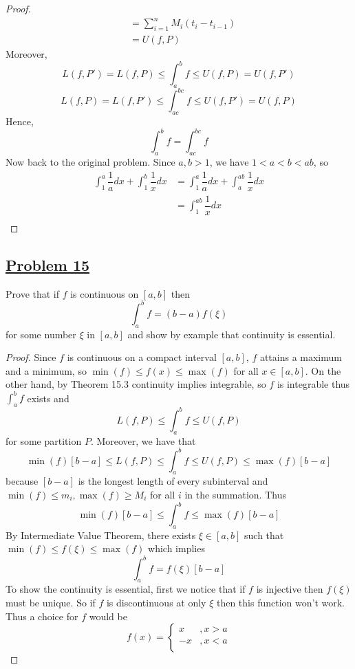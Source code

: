 \documentclass[10pt,letterpaper]{article}
\begin{document}
\begin{proof}
\begin{align*}
		&= \displaystyle\sum_{i=1}^{n} M_i(t_i - t_{i-1}) \\
		&= U(f, P)
	\end{align*}
	Moreover,
	$$L(f, P') = L(f, P) \leq \displaystyle\int_{a}^{b} f \leq U(f, P) = U(f, P')$$
	$$L(f, P) = L(f, P') \leq \displaystyle\int_{ac}^{bc} f \leq U(f, P') = U(f, P)$$
	Hence,
	$$\displaystyle\int_{a}^{b} f= \displaystyle\int_{ac}^{bc} f$$
	Now back to the original problem. Since $a, b > 1$, we have $1 < a < b < ab$, so 
	\begin{align*}
	\displaystyle\int_{1}^{a} \dfrac{1}{a} dx + \displaystyle\int_{1}^{b} \dfrac{1}{x} dx 
	&= \displaystyle\int_{1}^{a} \dfrac{1}{a} dx + \displaystyle\int_{a}^{ab} \dfrac{1}{x} dx \\
	&= \displaystyle\int_{1}^{ab} \dfrac{1}{x} dx \\
	\end{align*}
	
	
	
	
	
	
	
	
	\end{proof}
	
	\subsection*{{\color{purple}\underline{Problem 15}}}
	Prove that if $f$ is continuous on $[a, b]$ then
	$$\displaystyle\int_{a}^{b} f = (b - a)f(\xi)$$
	for some number $\xi$ in $[a, b]$ and show by example that continuity is essential.
	\begin{proof}
	Since $f$ is continuous on a compact interval $[a, b]$, $f$ attains a maximum and a minimum, so 
	$\min(f) \leq f(x) \leq \max(f)$ for all $x \in [a, b]$. On the other hand, by Theorem 15.3
	continuity implies integrable, so $f$ is integrable thus $\displaystyle\int_{a}^{b} f$ exists and
	$$L(f, P) \leq \displaystyle\int_{a}^{b} f \leq U(f, P)$$
	for some partition $P$.	Moreover, we have that 
	$$\min(f)[b - a] \leq L(f, P) \leq \displaystyle\int_{a}^{b} f \leq U(f, P) \leq \max(f)[b - a]$$
	because $[b - a]$ is the longest length of every subinterval and $\min(f) \leq m_i, \max(f) \geq M_i$
	for all $i$ in the summation. Thus
	$$\min(f)[b - a] \leq \displaystyle\int_{a}^{b} f \leq \max(f)[b - a]$$
	By Intermediate Value Theorem, there exists $\xi \in [a, b]$ such that $\min(f) \leq f(\xi) \leq \max(f)$ which implies
	$$\displaystyle\int_{a}^{b} f = f(\xi)[b - a]$$
	To show the continuity is essential, first we notice that if $f$ is injective then $f(\xi)$ must be unique. So if $f$ 
	is discontinuous at only $\xi$ then this function won't work. Thus a choice for $f$ would be
	$$f(x) = 
	\begin{cases}
		x  &, x > a \\
		-x  &, x < a \\
	\end{cases}
	$$
	\end{proof}
\end{document}
